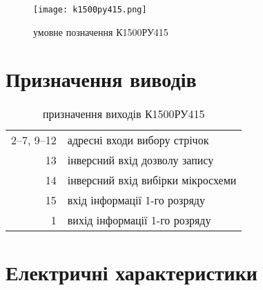 \documentclass[a4paper, 12pt, oneside]{extreport}
\begin{document}
\begin{figure}[h]
	\centering
	\texttt{[image: k1500py415.png]}
	\caption{умовне позначення К1500РУ415}
\end{figure}

\newcommand\chip{К1500РУ415}

\section{Призначення виводів}

\begin{table}[h]
	\centering
	\begin{tabular}{r|l}
	2--7, 9--12	&адресні входи вибору стрічок \\
	13	&інверсний вхід дозволу запису \\
	14	&інверсний вхід вибірки мікросхеми \\
	15	&вхід інформації 1-го розряду \\
	1	&вихід інформації 1-го розряду
	\end{tabular}
	\caption{призначення виходів \chip}
\end{table}

\section{Електричні характеристики}

\newcommand\myheading[1]{\hspace{-1em}\textbf{#1}\\}

\end{document}
